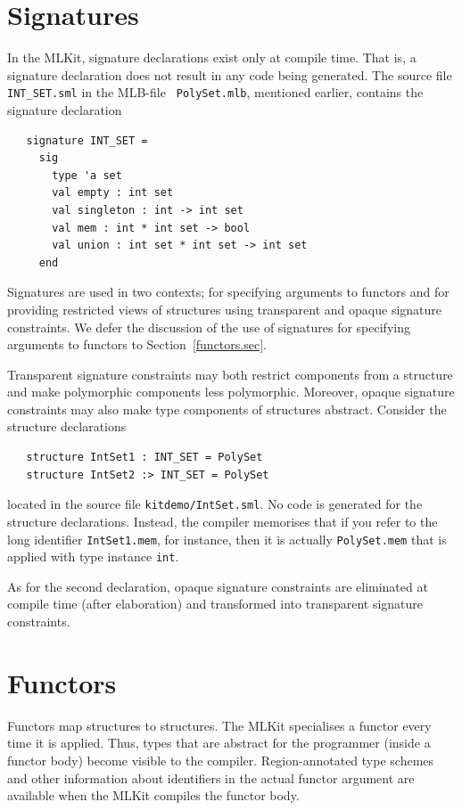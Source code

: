\documentclass[12pt]{book}
\begin{document}
\section{Signatures}
%
In the MLKit, signature declarations exist only at compile time. That
is, a signature declaration does not result in any code being
generated. The source file {\tt INT\_SET.sml} in the MLB-file {\tt
  PolySet.mlb}, mentioned earlier, contains the signature declaration
\begin{verbatim}
   signature INT_SET =
     sig
       type 'a set
       val empty : int set
       val singleton : int -> int set
       val mem : int * int set -> bool
       val union : int set * int set -> int set
     end
\end{verbatim}

Signatures are used in two contexts; for specifying arguments to
functors and for providing restricted views of structures using
%
transparent and 
%
opaque signature constraints. We defer the discussion of the use of
signatures for specifying arguments to functors to
Section~\ref{functors.sec}.

Transparent signature constraints may both restrict components from a
structure and make polymorphic components less polymorphic. Moreover,
opaque signature constraints may also make type components of
structures abstract. Consider the structure declarations
\begin{verbatim}
   structure IntSet1 : INT_SET = PolySet
   structure IntSet2 :> INT_SET = PolySet
\end{verbatim}

\noindent
located in the source file {\tt kitdemo/IntSet.sml}. No code is
generated for the structure declarations. Instead, the compiler
memorises that if you refer to the long identifier {\tt IntSet1.mem},
for instance, then it is actually {\tt PolySet.mem} that is applied
with type instance {\tt int}.

As for the second declaration, opaque signature constraints are
eliminated at compile time (after elaboration) and transformed into
transparent signature constraints.

\section{Functors \label{functors.sec}}
%
%
Functors map structures to structures. The MLKit specialises a functor
every time it is applied.  Thus, types that are abstract for the
programmer (inside a functor body) become visible to the compiler.
Region-annotated type schemes and other information about identifiers
in the actual functor argument are available when the MLKit compiles the
functor body.
\end{document}

